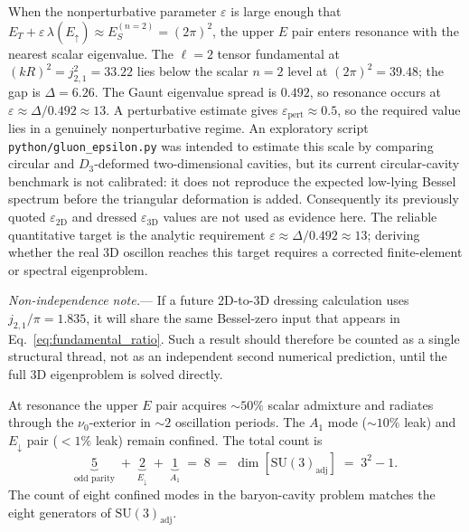 \documentclass[11pt]{article}
\begin{document}
When the nonperturbative parameter $\varepsilon$
is large enough that
$E_T + \varepsilon\,\lambda(E_{\uparrow})
\approx E_S^{(n=2)} = (2\pi)^2$,
the upper $E$ pair enters resonance with the
nearest scalar eigenvalue.
The $\ell=2$ tensor fundamental at
$(kR)^2 = j_{2,1}^2 = 33.22$ lies below
the scalar $n=2$ level at $(2\pi)^2 = 39.48$;
the gap is $\Delta = 6.26$.  The Gaunt eigenvalue
spread is $0.492$, so resonance occurs at
$\varepsilon \approx \Delta / 0.492 \approx 13$.
A perturbative estimate gives
$\varepsilon_{\text{pert}} \approx 0.5$, so the
required value lies in a genuinely nonperturbative
regime.  An exploratory script
\texttt{python/gluon\_epsilon.py} was intended to
estimate this scale by comparing circular and
$D_3$-deformed two-dimensional cavities, but its
current circular-cavity benchmark is not calibrated:
it does not reproduce the expected low-lying Bessel
spectrum before the triangular deformation is added.
Consequently its previously quoted
$\varepsilon_{\text{2D}}$ and dressed
$\varepsilon_{\text{3D}}$ values are not used as
evidence here.  The reliable quantitative target is
the analytic requirement
$\varepsilon \approx \Delta/0.492 \approx 13$;
deriving whether the real 3D oscillon reaches this
target requires a corrected finite-element or
spectral eigenproblem.

\textit{Non-independence note.}---%
If a future 2D-to-3D dressing calculation uses
$j_{2,1}/\pi = 1.835$, it will share the same
Bessel-zero input that appears in
Eq.~\eqref{eq:fundamental_ratio}.  Such a result
should therefore be counted as a single structural
thread, not as an independent second numerical
prediction, until the full 3D eigenproblem is
solved directly.

At resonance the upper $E$ pair acquires
$\sim 50\%$ scalar admixture and radiates
through the $\nu_0$-exterior in $\sim 2$ oscillation
periods.  The $A_1$ mode ($\sim 10\%$ leak) and
$E_{\downarrow}$ pair ($< 1\%$ leak) remain
confined.  The total count is
\begin{equation}\label{eq:eight_gluons}
  \boxed{
  \underbrace{5}_{\text{odd parity}}
  \;+\;
  \underbrace{2}_{E_{\downarrow}}
  \;+\;
  \underbrace{1}_{A_1}
  \;=\; 8
  \;=\; \dim\!\left[\mathrm{SU}(3)_{\mathrm{adj}}\right]
  \;=\; 3^2 - 1.
  }
\end{equation}
The count of eight confined modes in the
baryon-cavity problem matches the eight
generators of $\mathrm{SU}(3)_{\mathrm{adj}}$.
\end{document}
